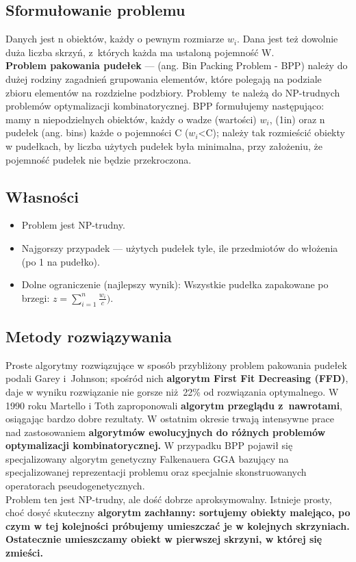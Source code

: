 \documentclass[10pt, a
4paper]{article}
\begin{document}
\subsection{Sformułowanie problemu}
Danych jest n obiektów, każdy o pewnym rozmiarze $w_{i}$. Dana jest też dowolnie duża liczba skrzyń, z~których każda ma ustaloną pojemność W. \\
\textbf{Problem pakowania pudełek} --- (ang. Bin Packing Problem - BPP) należy do
dużej rodziny zagadnień grupowania elementów, które polegają na podziale
zbioru elementów na rozdzielne podzbiory. Problemy~te należą do NP-trudnych
problemów optymalizacji kombinatorycznej. BPP formułujemy następująco:
mamy n niepodzielnych obiektów, każdy o wadze (wartości) $w_{i}$, (1in) oraz n pudełek (ang. bins) każde o pojemności C ($w_{i}$<C); należy tak rozmieścić obiekty w pudełkach, by liczba użytych pudełek była minimalna, przy założeniu, że pojemność pudełek nie będzie przekroczona.

\subsection{Własności}
\begin{itemize}
\item Problem jest NP-trudny.
\item Najgorszy przypadek --- użytych pudełek tyle, ile przedmiotów do włożenia (po 1 na pudełko).
\item Dolne ograniczenie (najlepszy wynik): Wszystkie pudełka zapakowane po brzegi:
$z = \sum_{i=1}^{n} \frac{w_{i}}{c})$.
\end{itemize}

\subsection{Metody rozwiązywania}
\indent Proste algorytmy rozwiązujące w sposób przybliżony problem pakowania
pudełek podali Garey i~Johnson; spośród nich \textbf{algorytm First Fit Decreasing
(FFD)}, daje w wyniku rozwiązanie nie gorsze niż~22\% od rozwiązania
optymalnego. W 1990 roku Martello i Toth zaproponowali \textbf{algorytm przeglądu z~nawrotami}, osiągając bardzo dobre rezultaty. W ostatnim okresie trwają intensywne prace nad zastosowaniem \textbf{algorytmów ewolucyjnych do różnych problemów optymalizacji kombinatorycznej.} W przypadku BPP pojawił się specjalizowany algorytm
genetyczny Falkenauera GGA bazujący na specjalizowanej reprezentacji
problemu oraz specjalnie skonstruowanych operatorach pseudogenetycznych.\\
\indent Problem ten jest NP-trudny, ale dość dobrze aproksymowalny.
Istnieje prosty, choć dosyć skuteczny \textbf{algorytm zachłanny: sortujemy obiekty malejąco, po czym w tej kolejności próbujemy umieszczać je w kolejnych skrzyniach. Ostatecznie umieszczamy obiekt w pierwszej skrzyni, w której się zmieści.}
\end{document}
